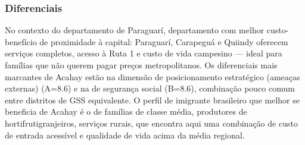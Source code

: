 \subsubsection*{Diferenciais}\label{dif-acahay-0902}
No contexto do departamento de Paraguarí, departamento com melhor custo-benefício de proximidade à capital: Paraguarí, Carapeguá e Quiindy oferecem serviços completos, acesso à Ruta 1 e custo de vida campesino — ideal para famílias que não querem pagar preços metropolitanos. Os diferenciais mais marcantes de Acahay estão na dimensão de posicionamento estratégico (ameaças externas) (A=8.6) e na de segurança social (B=8.6), combinação pouco comum entre distritos de GSS equivalente. O perfil de imigrante brasileiro que melhor se beneficia de Acahay é o de famílias de classe média, produtores de hortifrutigranjeiros, serviços rurais, que encontra aqui uma combinação de custo de entrada acessível e qualidade de vida acima da média regional.
